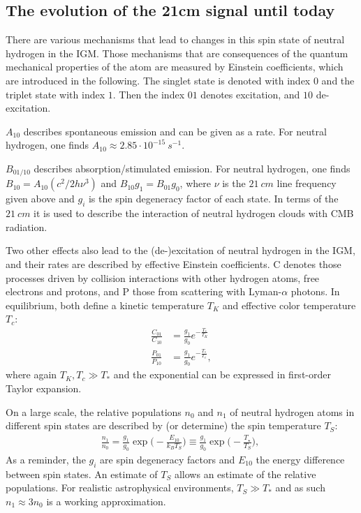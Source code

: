 \subsection{The evolution of the 21cm signal until today}
There are various mechanisms that lead to changes in this spin state of neutral hydrogen in the IGM. Those mechanisms that are consequences of the quantum mechanical properties of the atom are measured by Einstein coefficients, which are introduced in the following. The singlet state is denoted with index $0$ and the triplet state with index $1$. Then the index $01$ denotes excitation, and $10$ de-excitation. 

$A_{10}$ describes spontaneous emission and can be given as a rate. For neutral hydrogen, one finds $A_{10}\approx 2.85\cdot 10^{-15}~\si{s}^{-1}$.

$B_{01/10}$ describes absorption/stimulated emission. For neutral hydrogen, one finds $B_{10} = A_{10}(c^2 /2h\nu^3)$ and $B_{10}g_1 = B_{01}g_0$, where $\nu$ is the $21~\si{cm}$ line frequency given above and $g_i$ is the spin degeneracy factor of each state. In terms of the $21~\si{cm}$ it is used to describe the interaction of neutral hydrogen clouds with CMB radiation.

Two other effects also lead to the (de-)excitation of neutral hydrogen in the IGM, and their rates are described by effective Einstein coefficients. C denotes those processes driven by collision interactions with other hydrogen atoms, free electrons and protons, and P those from scattering with Lyman-$\alpha$ photons. In equilibrium, both define a kinetic temperature $T_K$ and effective color temperature $T_c$:
\begin{align}
    \frac{C_{01}}{C_{10}} &= \frac{g_1}{g_0} e^{-\frac{T_*}{T_K}}\\
    \frac{P_{01}}{P_{10}} &= \frac{g_1}{g_0} e^{-\frac{T_*}{T_c}},
\end{align}
where again $T_K,T_c \gg T_*$ and the exponential can be expressed in first-order Taylor expansion.

On a large scale, the relative populations $n_0$ and $n_1$ of neutral hydrogen atoms in different spin states are described by (or determine) the spin temperature $T_S$:
\begin{align}
    \frac{n_1}{n_0} 
    = \frac{g_1}{g_0} \exp \biggl(-\frac{E_{10}}{k_B T_S}\biggr) 
    \equiv \frac{g_1}{g_0} \exp \biggl(-\frac{T_\star}{T_S}\biggr),~\label{eq:Boltzmann}
\end{align} 
As a reminder, the $g_i$ are spin degeneracy factors and $E_{10}$ the energy difference between spin states. An estimate of $T_S$ allows an estimate of the relative populations. For realistic astrophysical environments, $T_S \gg T_*$ and as such $n_1 \approx 3n_0$ is a working approximation. 

